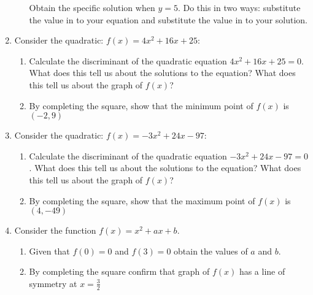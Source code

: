 \begin{pyin}
\begin{enumerate}
\begin{enumerate}
Obtain the specific solution when \(y = 5\). Do this in two ways:
substitute the value in to your equation and substitute the value in to
your solution.

\end{enumerate}

\item 

Consider the quadratic: \(f(x)=4x ^ 2 + 16x + 25\):
\begin{enumerate}

\item 

Calculate the discriminant of the quadratic equation \(4x ^ 2 + 16x + 25 =
0\). What does this tell us about the solutions to the equation? What
does this tell us about the graph of \(f(x)\)?

\item 

By completing the square, show that the minimum point of \(f(x)\) is
\(\left(-2, 9\right)\)

\end{enumerate}

\item 

Consider the quadratic: \(f(x)=-3x ^ 2 + 24x - 97\):
\begin{enumerate}

\item 

Calculate the discriminant of the quadratic equation \(-3x ^ 2 + 24x - 97 =
0\). What does this tell us about the solutions to the equation? What
does this tell us about the graph of \(f(x)\)?

\item 

By completing the square, show that the maximum point of \(f(x)\) is
\(\left(4, -49\right)\)

\end{enumerate}

\item 

Consider the function \(f(x) = x^ 2 + a x + b\).
\begin{enumerate}

\item 

Given that \(f(0) = 0\) and \(f(3) = 0\) obtain the values of \(a\) and \(b\).

\item 

By completing the square confirm that graph of \(f(x)\) has a line of symmetry at \(x=\frac{3}{2}\)


\end{enumerate}
\end{enumerate}
\end{pyin}
